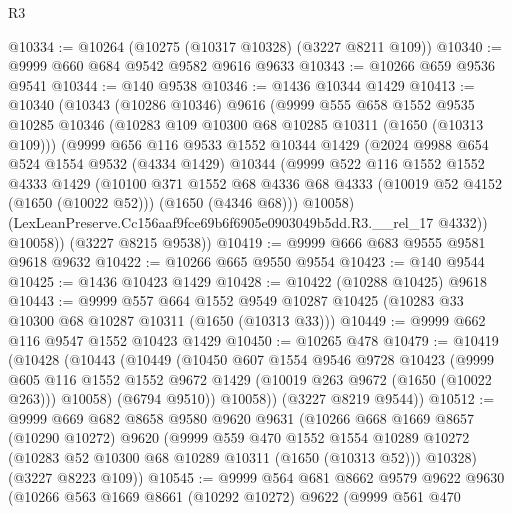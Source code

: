 \begin{lexlean}{R3}
\begin{coremodule}
@10334 := @10264 (@10275 (@10317 @10328) (@3227 @8211 @109))
@10340 := @9999 @660 @684 @9542 @9582 @9616 @9633
@10343 := @10266 @659 @9536 @9541
@10344 := @140 @9538
@10346 := @1436 @10344 @1429
@10413 := @10340
    (@10343
      (@10286 @10346)
      @9616
      (@9999
        @555
        @658
        @1552
        @9535
        @10285
        @10346
        (@10283 @109 @10300 @68 @10285 @10311 (@1650 (@10313 @109)))
        (@9999
          @656
          @116
          @9533
          @1552
          @10344
          @1429
          (@2024
            @9988
            @654
            @524
            @1554
            @9532
            (@4334 @1429)
            @10344
            (@9999
              @522
              @116
              @1552
              @1552
              @4333
              @1429
              (@10100
                @371
                @1552
                @68
                @4336
                @68
                @4333
                (@10019 @52 @4152 (@1650 (@10022 @52)))
                (@1650 (@4346 @68)))
              @10058)
            (LexLeanPreserve.Cc156aaf9fce69b6f6905e0903049b5dd.R3.__rel_17 @4332))
          @10058))
      (@3227 @8215 @9538))
@10419 := @9999 @666 @683 @9555 @9581 @9618 @9632
@10422 := @10266 @665 @9550 @9554
@10423 := @140 @9544
@10425 := @1436 @10423 @1429
@10428 := @10422 (@10288 @10425) @9618
@10443 := @9999
    @557
    @664
    @1552
    @9549
    @10287
    @10425
    (@10283 @33 @10300 @68 @10287 @10311 (@1650 (@10313 @33)))
@10449 := @9999 @662 @116 @9547 @1552 @10423 @1429
@10450 := @10265 @478
@10479 := @10419
    (@10428
      (@10443
        (@10449
          (@10450
            @607
            @1554
            @9546
            @9728
            @10423
            (@9999
              @605
              @116
              @1552
              @1552
              @9672
              @1429
              (@10019 @263 @9672 (@1650 (@10022 @263)))
              @10058)
            (@6794 @9510))
          @10058))
      (@3227 @8219 @9544))
@10512 := @9999
    @669
    @682
    @8658
    @9580
    @9620
    @9631
    (@10266
      @668
      @1669
      @8657
      (@10290 @10272)
      @9620
      (@9999
        @559
        @470
        @1552
        @1554
        @10289
        @10272
        (@10283 @52 @10300 @68 @10289 @10311 (@1650 (@10313 @52)))
        @10328)
      (@3227 @8223 @109))
@10545 := @9999
    @564
    @681
    @8662
    @9579
    @9622
    @9630
    (@10266
      @563
      @1669
      @8661
      (@10292 @10272)
      @9622
      (@9999
        @561
        @470

\end{coremodule}
\end{lexlean}
